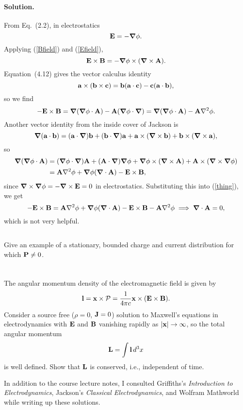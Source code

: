 \documentclass[11pt]{article}
\newcommand{\refeq}[1]{(\ref{#1})}
\newcommand{\beq}{\begin{equation*}}
\newcommand{\eeq}{\end{equation*}}
\newcommand{\beqn}{\begin{equation}}
\newcommand{\eeqn}{\end{equation}}
\newenvironment{statement}[1]
{
	\section{#1}
	\color{darkgray}
	\ignorespaces
}
{
}
\newenvironment{problem}
{
	\subsection{}
	\color{darkgray}
    \ignorespaces
}
{

}
\newenvironment{solution}
{
    \paragraph{Solution.}
    \ignorespaces
}
{
    \bigskip
}
\begin{document}
\begin{solution}
	From Eq.~(2.2), in electrostatics
	\beqn \label{Efield}
		\vE = -\grad\phi.
	\eeqn
	Applying \refeq{Bfield} and \refeq{Efield},
	\beq
		\vE \times \vB = -\grad\phi \times (\grad \times \vA).
	\eeq
	Equation~(4.12) gives the vector calculus identity
	\beq
		\vaa \times (\vbb \times \vc) = \vbb (\vaa \cdot \vc) - \vc (\vaa \cdot \vbb),
	\eeq
	so we find
	\beqn \label{thing}
		-\vE \times \vB = \grad (\grad\phi \cdot \vA) - \vA (\grad \phi \cdot \grad)
		= \grad (\grad\phi \cdot \vA) - \vA \lap\phi.
	\eeqn
	Another vector identity from the inside cover of Jackson is
	\beq
		\grad (\vaa \cdot \vbb) = (\vaa \cdot \grad) \vbb + (\vbb \cdot \grad) \vaa + \vaa \times (\grad \times \vbb) + \vbb \times (\grad \times \vaa),
	\eeq
	so
	\begin{align*}
		\grad (\grad\phi \cdot \vA) &= (\grad\phi \cdot \grad) \vA + (\vA \cdot \grad) \grad\phi + \grad\phi \times (\grad \times \vA) + \vA \times (\grad \times \grad\phi) \\
		&= \vA \lap\phi + \grad\phi (\grad \cdot \vA) - \vE \times \vB,
	\end{align*}
	since $\grad \times \grad\phi = -\grad \times \vb{E} = 0$ in electrostatics.
	Substituting this into \refeq{thing}, we get 
	\beq
		-\vE \times \vB = \vA \lap\phi + \grad\phi (\grad \cdot \vA) - \vE \times \vB - \vA \lap\phi 
		\implies
		\grad \cdot \vA = 0,
	\eeq
	which is not very helpful.
\end{solution}

\begin{problem}
	Give an example of a stationary, bounded charge and current distribution for which $\vb{P} \neq 0$.
\end{problem}



\newcommand{\vl}{\vb{l}}
\newcommand{\vL}{\vb{L}}

\begin{statement}{}
	The angular momentum density of the electromagnetic field is given by
	\beq
		\vl = \vx \times \vcP
		= \frac{1}{4\pi c} \vx \times (\vE \times \vB).
	\eeq
	Consider a source free ($\rho = 0$, $\vb{J} = 0$) solution to Maxwell's equations in electrodynamics with $\vb{E}$ and $\vb{B}$ vanishing rapidly as $\abs{\vb{x}} \to \infty$, so the total angular momentum
	\beq
		\vL = \int \vl \dcx
	\eeq
	is well defined.  Show that $\vL$ is conserved, i.e., independent of time.
\end{statement}



\vfill
In addition to the course lecture notes, I consulted Griffiths's \emph{Introduction to Electrodynamics}, Jackson's \emph{Classical Electrodynamics}, and Wolfram Mathworld while writing up these solutions.
\end{document}
